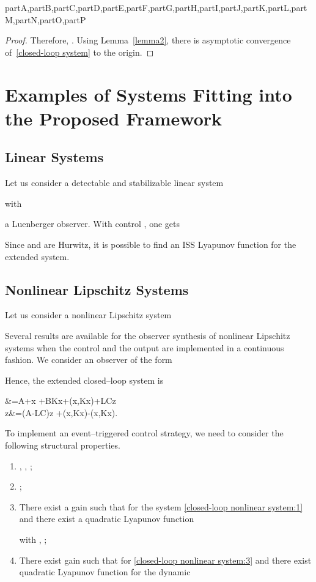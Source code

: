 \documentclass[letterpaper, 10 pt, conference]{ieeeconf}
\def\compile{partA,partB,partC,partD,partE,partF,partG,partH,partI,partJ,partK,partL,partM,partN,partO,partP}
\begin{document}
\begin{xcomment}{\compile}
\begin{partN}
\begin{proof}
Therefore, . Using Lemma~\ref{lemma2}, there is asymptotic convergence of~\eqref{closed-loop system} to the origin.
\end{proof}


\section{Examples of Systems Fitting into the Proposed Framework}

\subsection{Linear Systems}

Let us consider a detectable and stabilizable linear system

with 

a Luenberger observer. With control , one gets

Since  and  are Hurwitz, it is possible to find an ISS Lyapunov function for the extended system. 



\subsection{Nonlinear Lipschitz Systems}

Let us consider a nonlinear Lipschitz system 

Several results are available for the observer synthesis of nonlinear Lipschitz systems when the control and the output are implemented in a continuous fashion. We consider an observer of the form

Hence, the extended closed--loop system is

&=A+\hat x +BK\hat x+\phi(\hat x,K\hat x)+LCz    \label{closed-loop nonlinear system:2} \\
\dot z&=(A-LC)z +\phi(x,K\hat x)-\phi(\hat x,K\hat x).        \label{closed-loop nonlinear system:3}

To implement an event--triggered control strategy, we need to consider the following structural properties.
\begin{enumerate}
\item[]  , , ;
\item[] ;
\item[] There exist a gain  such that  for the system \eqref{closed-loop nonlinear system:1} and there exist a quadratic Lyapunov function
 
with , ;
\item[] There exist gain  such that for \eqref{closed-loop nonlinear system:3} and there exist  quadratic Lyapunov function for the  dynamic 


\end{enumerate}
\end{partN}
\end{xcomment}
\end{document}
